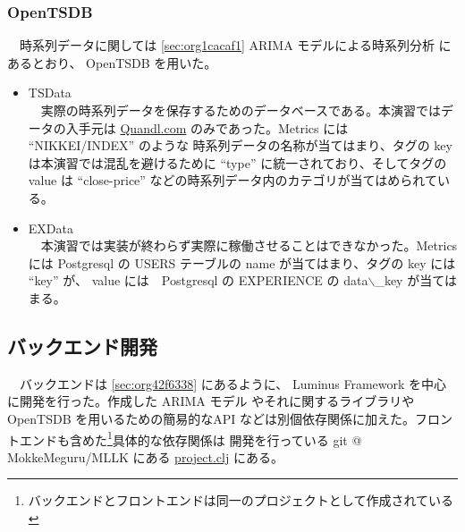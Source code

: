 \documentclass[dvipdfmx]{scrartcl}
\begin{document}
\subsubsection{OpenTSDB}
\label{sec:orgd8b3f2e}
　時系列データに関しては \ref{sec:org1cacaf1} ARIMA モデルによる時系列分析 にあるとおり、 OpenTSDB を用いた。\\
\begin{itemize}
\item TSData\\
　実際の時系列データを保存するためのデータベースである。本演習ではデータの入手元は \href{https://www.quandl.com/}{Quandl.com} のみであった。Metrics には ``NIKKEI/INDEX'' のような 時系列データの名称が当てはまり、タグの key は本演習では混乱を避けるために ``type'' に統一されており、そしてタグの value は ``close-price'' などの時系列データ内のカテゴリが当てはめられている。\\
\item EXData\\
　本演習では実装が終わらず実際に稼働させることはできなかった。Metrics には Postgresql の USERS テーブルの name が当てはまり、タグの key には ``key'' が、 value には　Postgresql の EXPERIENCE の data$\backslash$\_key が当てはまる。\\
\end{itemize}

\subsection{バックエンド開発}
\label{sec:org9cd826c}
　バックエンドは \ref{sec:org42f6338} にあるように、 Luminus Framework を中心に開発を行った。作成した ARIMA モデル やそれに関するライブラリや OpenTSDB を用いるための簡易的なAPI などは別個依存関係に加えた。フロントエンドも含めた\footnote{バックエンドとフロントエンドは同一のプロジェクトとして作成されている}具体的な依存関係は 開発を行っている git @ MokkeMeguru/MLLK にある \href{https://github.com/MokkeMeguru/MLLK/blob/master/project.clj}{project.clj} にある。\\
\end{document}
